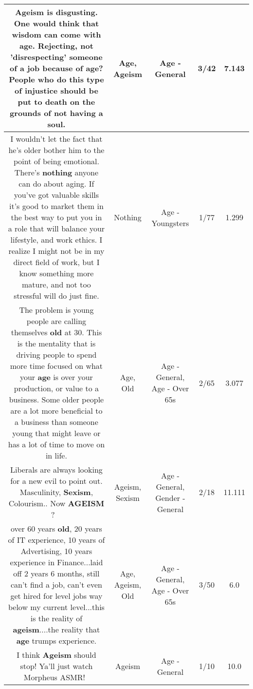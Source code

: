 \documentclass[11pt]{article}
\newlength\mylength
\begin{document}
\begin{center}
\begin{longtable}{|C{.65\mylength}|C{.30\mylength}|C{.12\mylength}|C{.12\mylength}|C{.12\mylength}|}
  \small Ageism is disgusting. One would think that wisdom can come with \textbf{age}. Rejecting, not 'disrespecting' someone of a job because of \textbf{age}? People who do this type of injustice should be put to death on the grounds of not having a soul.\normalsize   & Age, Ageism & Age - General & 3/42 & 7.143 \\  \hline
  \small I wouldn't let the fact that he's older bother him to the point of being emotional. There's \textbf{nothing} anyone can do about aging. If you've got valuable skills it's good to market them in the best way to put you in a role that will balance your lifestyle, and work ethics. I realize I might not be in my direct field of work, but I know something more mature, and not too stressful will do just fine.\normalsize   & Nothing & Age - Youngsters & 1/77 & 1.299 \\  \hline
  \small The problem is young people are calling themselves \textbf{old} at 30. This is the mentality that is driving people to spend more time focused on what your \textbf{age} is over your production, or value to a business. Some older people are a lot more beneficial to a business than someone young that might leave or has a lot of time to move on in life.\normalsize   & Age, Old & Age - General, Age - Over 65s & 2/65 & 3.077 \\  \hline
  \small Liberals are always looking for a new evil to point out. Masculinity, \textbf{Sexism}, Colourism.. Now \textbf{AGEISM} ? 🤣🤣\normalsize   & Ageism, Sexism & Age - General, Gender - General & 2/18 & 11.111 \\  \hline
  \small over 60 years \textbf{old},  20 years of IT experience,  10 years of Advertising, 10 years experience in Finance...laid off 2 years 6 months, still can't find a job,  can't even get hired for level jobs way below my current level...this is the reality of \textbf{ageism}....the reality that \textbf{age} trumps experience.\normalsize   & Age, Ageism, Old & Age - General, Age - Over 65s & 3/50 & 6.0 \\  \hline
  \small I think \textbf{Ageism} should stop! Ya'll just watch Morpheus ASMR!~\normalsize   & Ageism & Age - General & 1/10 & 10.0 \\  \hline

\end{longtable}
\end{center}
\end{document}
